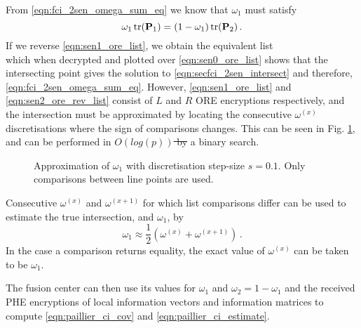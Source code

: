 \documentclass[letterpaper, 10 pt, conference]{ieeeconf}  %
\providecommand{\DIFadd}[1]{{\protect\color{blue}\uwave{#1}}} %
\providecommand{\DIFdel}[1]{{\protect\color{red}\sout{#1}}}                      %
\providecommand{\DIFaddbegin}{} %
\providecommand{\DIFaddend}{} %
\providecommand{\DIFdelbegin}{} %
\providecommand{\DIFdelend}{} %
\begin{document}
From \eqref{eqn:fci_2sen_omega_sum_eq} we know that $\omega_1$ must satisfy
\begin{equation}
   \omega_1 \operatorname{tr}({{\mathbf{P}}}_1) = (1-\omega_1)\operatorname{tr}({{\mathbf{P}}}_2)\,. \label{eqn:secfci_2sen_intersect}
\end{equation}
If we reverse \eqref{eqn:sen1_ore_list}, we obtain the equivalent list
\begin{equation}
   [\mathcal{E}^R_{ORE}((1-\omega^{(1)})\tr(\mP_2)),\dots,\mathcal{E}^R_{ORE}((1-\omega^{(p)})\tr(\mP_2))] \label{eqn:sen2_ore_rev_list}
\end{equation}
which when decrypted and plotted over \eqref{eqn:sen0_ore_list} shows that the intersecting point gives the solution to \eqref{eqn:secfci_2sen_intersect} and therefore, \eqref{eqn:fci_2sen_omega_sum_eq}. However, \eqref{eqn:sen1_ore_list} and \eqref{eqn:sen2_ore_rev_list} consist of $L$ and $R$ ORE encryptions respectively, and the intersection must be approximated by locating the consecutive $\omega^{(x)}$ discretisations where the sign of comparisons changes. This can be seen in Fig. \ref{fig:2_sensor_sol}, and can be performed in \DIFdelbegin \DIFdel{$O(log(p))$ by }\DIFdelend \DIFaddbegin \DIFadd{$O(\log{p})$ ORE comparisons using }\DIFaddend a binary search.
\begin{figure}[tb]
   \vspace{-5pt}
   \begin{center}
      
   \end{center}
   \vspace{-10pt}
   \caption{Approximation of $\omega_1$ with discretisation step-size $s=0.1$. Only comparisons between line points are used.}
   \vspace{-\baselineskip}
   \label{fig:2_sensor_sol}
\end{figure}
Consecutive $\omega^{(x)}$ and $\omega^{(x+1)}$ for which list comparisons differ can be used to estimate the true intersection, and $\omega_1$, by
\begin{equation}
   \omega_1 \approx \frac{1}{2}(\omega^{(x)} + \omega^{(x+1)})\,. \label{eqn:secfci_2sen_omega}
\end{equation}
In the case a comparison returns equality, the exact value of $\omega^{(x)}$ can be taken to be $\omega_1$.

The fusion center can then use its values for $\omega_1$ and $\omega_2 = 1-\omega_1$ and the received PHE encryptions of local information vectors and information matrices to compute \eqref{eqn:paillier_ci_cov} and \eqref{eqn:paillier_ci_estimate}.
\end{document}

